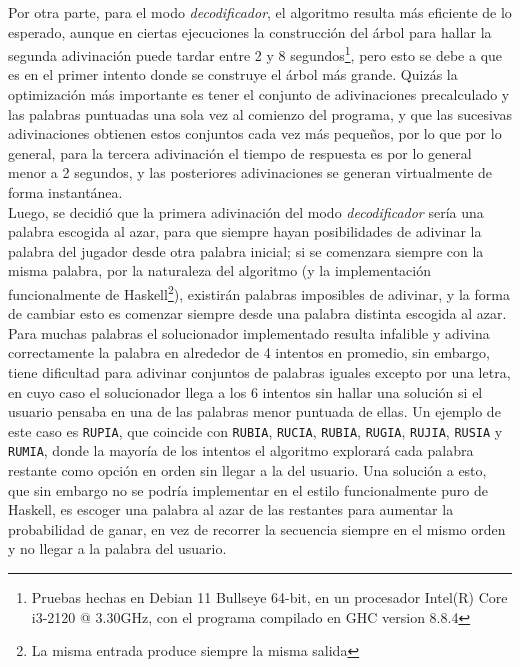 \documentclass[11pt]{article}
\begin{document}
Por otra parte, para el modo \emph{decodificador}, el algoritmo resulta más eficiente de lo
esperado, aunque en ciertas ejecuciones la construcción del árbol para hallar la segunda
adivinación puede tardar entre 2 y 8 segundos\footnote{Pruebas hechas en Debian 11 Bullseye 64-bit,
en un procesador Intel(R) Core i3-2120 @ 3.30GHz, con el programa compilado en GHC version 8.8.4},
pero esto se debe a que es en el primer intento donde se construye el árbol más grande. Quizás la
optimización más importante es tener el conjunto de adivinaciones precalculado y las palabras
puntuadas una sola vez al comienzo del programa, y que las sucesivas adivinaciones obtienen
estos conjuntos cada vez más pequeños, por lo que por lo general, para la tercera adivinación
el tiempo de respuesta es por lo general menor a 2 segundos, y las posteriores adivinaciones
se generan virtualmente de forma instantánea. \\

Luego, se decidió que la primera adivinación del modo \emph{decodificador} sería una palabra
escogida al azar, para que siempre hayan posibilidades de adivinar la palabra del jugador
desde otra palabra inicial; si se comenzara siempre con la misma palabra, por
la naturaleza del algoritmo (y la implementación funcionalmente de Haskell\footnote{La
misma entrada produce siempre la misma salida}), existirán palabras imposibles de
adivinar, y la forma de cambiar esto es comenzar siempre desde una palabra
distinta escogida al azar. \\

Para muchas palabras el solucionador implementado resulta infalible y adivina
correctamente la palabra en alrededor de 4 intentos en promedio, sin embargo,
tiene dificultad para adivinar conjuntos de palabras iguales excepto por una letra,
en cuyo caso el solucionador llega a los 6 intentos sin hallar una solución si
el usuario pensaba en una de las palabras menor puntuada de ellas. Un ejemplo de este caso
es \texttt{RUPIA}, que coincide con \texttt{RUBIA}, \texttt{RUCIA}, \texttt{RUBIA},
\texttt{RUGIA}, \texttt{RUJIA}, \texttt{RUSIA} y \texttt{RUMIA}, donde la mayoría
de los intentos el algoritmo explorará cada palabra restante como opción en orden sin llegar
a la del usuario. Una solución a esto, que sin embargo no se podría implementar en
el estilo funcionalmente puro de Haskell, es escoger una palabra al azar de las
restantes para aumentar la probabilidad de ganar, en vez de recorrer la secuencia
siempre en el mismo orden y no llegar a la palabra del usuario. \\
\end{document}
